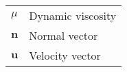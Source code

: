 
\begin{tabular}{l l}
  $\mu$ & Dynamic viscosity \\
  $\mathbf{n}$ & Normal vector\\
  $\mathbf{u}$ & Velocity vector
\end{tabular}
